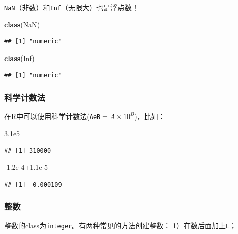 \documentclass[]{book}
\newenvironment{Shaded}{\begin{snugshade}}{\end{snugshade}}
\newcommand{\FloatTok}[1]{\textcolor[rgb]{0.00,0.00,0.81}{#1}}
\newcommand{\KeywordTok}[1]{\textcolor[rgb]{0.13,0.29,0.53}{\textbf{#1}}}
\newcommand{\NormalTok}[1]{#1}
\newcommand{\OtherTok}[1]{\textcolor[rgb]{0.56,0.35,0.01}{#1}}
\begin{document}
\texttt{NaN}（非数）和\texttt{Inf}（无限大）也是浮点数！

\begin{Shaded}
\begin{Highlighting}[]
\KeywordTok{class}\NormalTok{(}\OtherTok{NaN}\NormalTok{)}
\end{Highlighting}
\end{Shaded}

\begin{verbatim}
## [1] "numeric"
\end{verbatim}

\begin{Shaded}
\begin{Highlighting}[]
\KeywordTok{class}\NormalTok{(}\OtherTok{Inf}\NormalTok{)}
\end{Highlighting}
\end{Shaded}

\begin{verbatim}
## [1] "numeric"
\end{verbatim}

\subsubsection{科学计数法}

在R中可以使用科学计数法(\texttt{AeB}\(= A \times 10^B\))，比如：

\begin{Shaded}
\begin{Highlighting}[]
\FloatTok{3.1e5}
\end{Highlighting}
\end{Shaded}

\begin{verbatim}
## [1] 310000
\end{verbatim}

\begin{Shaded}
\begin{Highlighting}[]
\FloatTok{-1.2e-4+1.1e-5}
\end{Highlighting}
\end{Shaded}

\begin{verbatim}
## [1] -0.000109
\end{verbatim}

\subsubsection{整数}

整数的class为\texttt{integer}。有两种常见的方法创建整数：
1）在数后面加上\texttt{L}；
\end{document}
